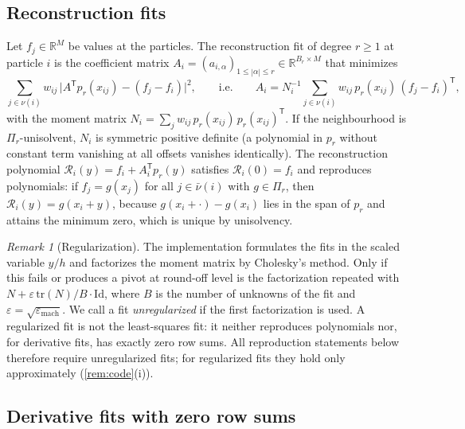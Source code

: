 \documentclass[11pt,a4paper]{article}
\theoremstyle{plain}
\theoremstyle{definition}
\theoremstyle{remark}
\newtheorem{remark}[theorem]{Remark}
\numberwithin{equation}{section}
\newcommand{\R}{\mathbb{R}}
\newcommand{\nb}{\nu}
\newcommand{\cnb}{\bar\nu}
\begin{document}
\subsection{Reconstruction fits}\label{sec:recfit}

Let $f_j\in\R^M$ be values at the particles. The reconstruction fit of degree $r\ge1$ at particle $i$ is the coefficient matrix $A_i=(a_{i,\alpha})_{1\le|\alpha|\le r}\in\R^{B_r\times M}$ that minimizes
\begin{equation}\label{eq:recfit}
\sum_{j\in\nb(i)} w_{ij}\,\big| A^{\mathsf T}p_r(x_{ij}) - (f_j - f_i)\big|^2 ,
\qquad\text{i.e.}\qquad
A_i = N_i^{-1}\sum_{j\in\nb(i)} w_{ij}\, p_r(x_{ij})\,(f_j-f_i)^{\mathsf T},
\end{equation}
with the moment matrix $N_i=\sum_{j} w_{ij}\,p_r(x_{ij})\,p_r(x_{ij})^{\mathsf T}$. If the neighbourhood is $\Pi_r$-unisolvent, $N_i$ is symmetric positive definite (a polynomial in $p_r$ without constant term vanishing at all offsets vanishes identically). The reconstruction polynomial $\mathcal{R}_i(y) = f_i + A_i^{\mathsf T}p_r(y)$ satisfies $\mathcal{R}_i(0)=f_i$ and reproduces polynomials: if $f_j=g(x_j)$ for all $j\in\cnb(i)$ with $g\in\Pi_r$, then $\mathcal{R}_i(y)=g(x_i+y)$, because $g(x_i+\cdot)-g(x_i)$ lies in the span of $p_r$ and attains the minimum zero, which is unique by unisolvency.

\begin{remark}[Regularization]\label{rem:regularization}
The implementation formulates the fits in the scaled variable $y/h$ and factorizes the moment matrix by Cholesky's method. Only if this fails or produces a pivot at round-off level is the factorization repeated with $N+\varepsilon\,\mathrm{tr}(N)/B\cdot\mathrm{Id}$, where $B$ is the number of unknowns of the fit and $\varepsilon=\sqrt{\varepsilon_{\mathrm{mach}}}$. We call a fit \emph{unregularized} if the first factorization is used. A regularized fit is not the least-squares fit: it neither reproduces polynomials nor, for derivative fits, has exactly zero row sums. All reproduction statements below therefore require unregularized fits; for regularized fits they hold only approximately (\cref{rem:code}(i)).
\end{remark}

\subsection{Derivative fits with zero row sums}\label{sec:divfit}
\end{document}
